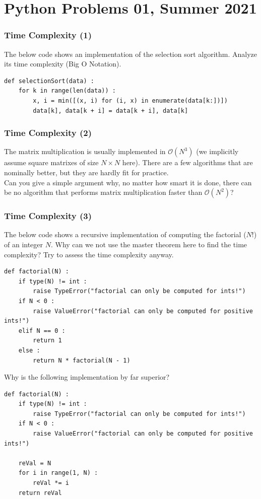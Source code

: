 \documentclass[
	english,
	fontsize=10pt,
	parskip=half,
	titlepage=true,
	DIV=12
]{scrartcl}
\begin{document}
\part*{Python Problems 01, Summer 2021}

\section{Time Complexity (1)}
The below code shows an implementation of the selection sort algorithm. Analyze its time complexity (Big O Notation).
\begin{verbatim}
def selectionSort(data) :
    for k in range(len(data)) :
        x, i = min([(x, i) for (i, x) in enumerate(data[k:])])
        data[k], data[k + i] = data[k + i], data[k]    
\end{verbatim}

\section{Time Complexity (2)}
The matrix multiplication is usually implemented in $\mathcal{O}(N^3)$ (we implicitly assume square matrixes of size $N \times N$ here). There are a few algorithms that are nominally better, but they are hardly fit for practice.\\
Can you give a simple argument why, no matter how smart it is done, there can be no algorithm that performs matrix multiplication faster than $\mathcal{O}(N^2)$?

\section{Time Complexity (3)}
The below code shows a recursive implementation of computing the factorial ($N!$) of an integer $N$. Why can we not use the master theorem here to find the time complexity? Try to assess the time complexity anyway.
\begin{verbatim}
def factorial(N) :
    if type(N) != int :
        raise TypeError("factorial can only be computed for ints!")
    if N < 0 :
        raise ValueError("factorial can only be computed for positive ints!")
    elif N == 0 :
        return 1
    else :
        return N * factorial(N - 1)
\end{verbatim}

Why is the following implementation by far superior?
\begin{verbatim}
def factorial(N) :
    if type(N) != int :
        raise TypeError("factorial can only be computed for ints!")
    if N < 0 :
        raise ValueError("factorial can only be computed for positive ints!")
    
    reVal = N
    for i in range(1, N) :
        reVal *= i
    return reVal
\end{verbatim}
\end{document}
